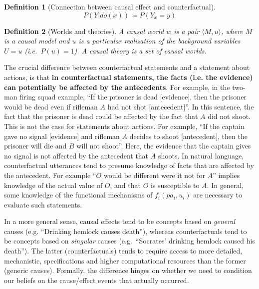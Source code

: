 \documentclass[11pt]{article}
\numberwithin{equation}{section}
\newcommand{\defeq}{\coloneqq}
\newtheorem{defn}{Definition}[section]
\begin{document}
\begin{defn}[Connection between causal effect and counterfactual]
\begin{equation}
P(Y|do(x)) \defeq P(Y_{x}=y)
\end{equation}
\end{defn}

\begin{defn}[Worlds and theories]
A causal world $w$ is a pair $\langle M,u \rangle$, where $M$ is a causal model and $u$ is a particular realization of the background variables $U=u$ (i.e.\ $P(u)=1$). A causal theory is a set of causal worlds.
\end{defn}

The crucial difference between counterfactual statements and a statement about actions, is that \textbf{in counterfactual statements, the facts (i.e. the evidence) can potentially be affected by the antecedents}. For example, in the two-man firing squad example, ``If the prisoner is dead [evidence], then the prisoner would be dead even if rifleman $A$ had not shot [antecedent]''. In this sentence, the fact that the prisoner is dead could be affected by the fact that $A$ did not shoot. This is not the case for statements about actions. For example, ``If the captain gave no signal [evidence] and rifleman $A$ decides to shoot [antecedent], then the prisoner will die and $B$ will not shoot''. Here, the evidence that the captain gives no signal is not affected by the antecedent that $A$ shoots. In natural language, counterfactual utterances tend to presume knowledge of facts that are affected by the antecedent. For example ``$O$ would be different were it not for $A$'' implies knowledge of the actual value of $O$, and that $O$ is susceptible to $A$. In general, some knowledge of the functional mechanisms of $f_i(pa_i, u_i)$ are necessary to evaluate such statements.

In a more general sense, causal effects tend to be concepts based on \textit{general} causes (e.g. ``Drinking hemlock causes death''), whereas counterfactuals tend to be concepts based on \textit{singular} causes (e.g.\ ``Socrates' drinking hemlock caused his death''). The latter (counterfactuals) tends to require access to more detailed, mechanistic, specifications and higher computational resources than the former (generic causes). Formally, the difference hinges on whether we need to condition our beliefs on the cause/effect events that actually occurred. 
\end{document}

